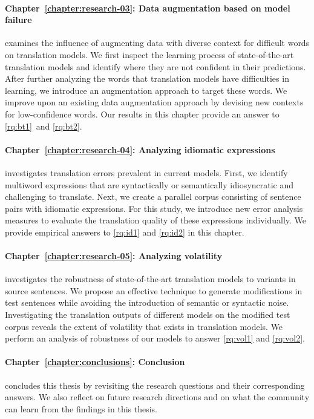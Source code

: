 \paragraph{Chapter~\ref{chapter:research-03}: Data augmentation based on model failure} examines the influence of augmenting data with diverse context for difficult words on translation models. 
We first inspect the learning process of state-of-the-art translation models and identify where they are not confident in their predictions. 
After further analyzing the words that translation models have difficulties in learning, we introduce an augmentation approach to target these words.
We improve upon an existing data augmentation approach by devising new contexts for low-confidence words.
Our results in this chapter provide an answer to \ref{rq:bt1}~and \ref{rq:bt2}.

\paragraph{Chapter~\ref{chapter:research-04}: Analyzing idiomatic expressions} investigates translation errors prevalent in current models. 
First, we identify multiword expressions that are syntactically or semantically idiosyncratic and challenging to translate. 
Next, we create a parallel corpus consisting of sentence pairs with idiomatic expressions.
For this study, we introduce new error analysis measures to evaluate the translation quality of these expressions individually.
We provide empirical answers to \ref{rq:id1} and \ref{rq:id2} in this chapter.

\paragraph{Chapter~\ref{chapter:research-05}: Analyzing volatility} investigates the robustness of state-of-the-art translation models to variants in source sentences. 
We propose an effective technique to generate modifications in test sentences while avoiding the introduction of semantic or syntactic noise.
Investigating the translation outputs of different models on the modified test corpus reveals the extent of volatility that exists in translation models.
We perform an analysis of robustness of our models to answer \ref{rq:vol1} and \ref{rq:vol2}.


\paragraph{Chapter~\ref{chapter:conclusions}: Conclusion} concludes this thesis by revisiting the research questions and their corresponding answers. 
We also reflect on future research directions and on what the community can learn from the findings in this thesis.


